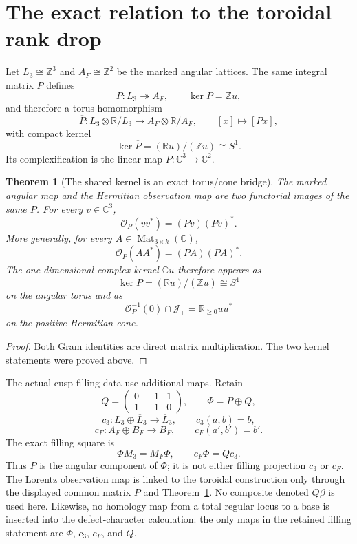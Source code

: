 \documentclass[11pt]{article}
\newtheorem{theorem}{Theorem}[section]
\theoremstyle{definition}
\newcommand{\C}{\mathbb C}
\newcommand{\R}{\mathbb R}
\newcommand{\Z}{\mathbb Z}
\newcommand{\Mat}{\operatorname{Mat}}
\newcommand{\Jp}{\mathcal J_+}
\begin{document}
\section{The exact relation to the toroidal rank drop}

Let $L_3\cong\Z^3$ and $A_F\cong\Z^2$ be the marked angular lattices.  The same integral matrix $P$ defines
\[
 P:L_3\twoheadrightarrow A_F,
 \qquad
 \ker P=\Z u,
\]
and therefore a torus homomorphism
\[
 \overline P:L_3\otimes\R/L_3\longrightarrow A_F\otimes\R/A_F,
 \qquad
 [x]\longmapsto[Px],
\]
with compact kernel
\[
 \ker\overline P=(\R u)/(\Z u)\cong S^1.
\]
Its complexification is the linear map $P:\C^3\to\C^2$.

\begin{theorem}[The shared kernel is an exact torus/cone bridge]\label{thm:kernel-bridge}
The marked angular map and the Hermitian observation map are two functorial images of the same $P$.  For every $v\in\C^3$,
\[
 \boxed{
 \mathcal O_P(vv^*)=(Pv)(Pv)^*.}
\]
More generally, for every $A\in\Mat_{3\times k}(\C)$,
\[
 \boxed{
 \mathcal O_P(AA^*)=(PA)(PA)^*.}
\]
The one-dimensional complex kernel $\C u$ therefore appears as
\[
 \ker\overline P=(\R u)/(\Z u)\cong S^1
\]
on the angular torus and as
\[
 \mathcal O_P^{-1}(0)\cap\Jp=\R_{\geq0}uu^*
\]
on the positive Hermitian cone.
\end{theorem}

\begin{proof}
Both Gram identities are direct matrix multiplication.  The two kernel statements were proved above.
\end{proof}

The actual cusp filling data use additional maps.  Retain
\[
 Q=\begin{pmatrix}0&-1&1\\1&-1&0\end{pmatrix},
 \qquad
 \Phi=P\oplus Q,
\]
\[
 c_3:L_3\oplus\overline L_3\longrightarrow\overline L_3,
 \qquad c_3(a,b)=b,
\]
\[
 c_F:A_F\oplus B_F\longrightarrow B_F,
 \qquad c_F(a',b')=b'.
\]
The exact filling square is
\[
 \boxed{\Phi M_3=M_F\Phi,\qquad c_F\Phi=Qc_3.}
\]
Thus $P$ is the angular component of $\Phi$; it is not either filling projection $c_3$ or $c_F$.  The Lorentz observation map is linked to the toroidal construction only through the displayed common matrix $P$ and Theorem~\ref{thm:kernel-bridge}.  No composite denoted $Q\beta$ is used here.  Likewise, no homology map from a total regular locus to a base is inserted into the defect-character calculation: the only maps in the retained filling statement are $\Phi$, $c_3$, $c_F$, and $Q$.
\end{document}
